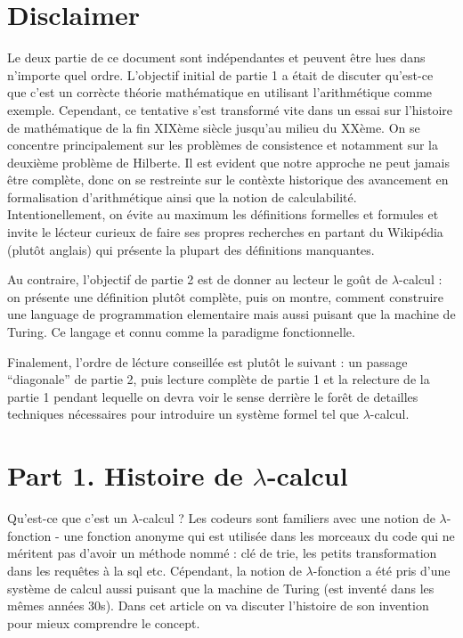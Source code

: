 \documentclass[12pt, a4paper]{article}
\begin{document}
	
\section*{Disclaimer}
Le deux partie de ce document sont indépendantes et peuvent être lues dans n'importe quel ordre.
L'objectif initial de partie 1 a était de discuter qu'est-ce que c'est un corrècte théorie mathématique en utilisant l'arithmétique comme exemple.
Cependant, ce tentative s'est transformé vite dans un essai sur l'histoire de mathématique de la fin XIXème siècle jusqu'au milieu du XXème.
On se concentre principalement sur les problèmes de consistence et notamment sur la deuxième problème de Hilberte.
Il est evident que notre approche ne peut jamais être complète, donc on se restreinte sur le contèxte historique des avancement en formalisation d'arithmétique ainsi que la notion de calculabilité.
Intentionellement, on évite au maximum les définitions formelles et formules et invite le lécteur curieux de faire ses propres recherches en partant du Wikipédia (plutôt anglais) qui présente la plupart des définitions manquantes.

Au contraire, l'objectif de partie 2 est de donner au lecteur le goût de $\lambda$-calcul : on présente une définition plutôt complète, puis on montre, comment construire une language de programmation elementaire mais aussi puisant que la machine de Turing.
Ce langage et connu comme la paradigme fonctionnelle.

Finalement, l'ordre de lécture conseillée est plutôt le suivant : un passage ``diagonale'' de partie 2, puis lecture complète de partie 1 et la relecture de la partie 1 pendant lequelle on devra voir le sense derrière le forêt de detailles techniques nécessaires pour introduire un système formel tel que $\lambda$-calcul.
	
\section*{Part 1. Histoire de $\lambda$-calcul}

Qu'est-ce que c'est un $\lambda$-calcul ?
Les codeurs sont familiers avec une notion de $\lambda$-fonction - une fonction anonyme qui est utilisée dans les morceaux du code qui ne méritent pas d'avoir un méthode nommé : clé de trie, les petits transformation dans les requêtes à la sql etc.
Cépendant, la notion de $\lambda$-fonction a été pris d'une système de calcul aussi puisant que la machine de Turing (est inventé dans les mêmes années 30s).
Dans cet article on va discuter l'histoire de son invention pour mieux comprendre le concept.
\end{document}
